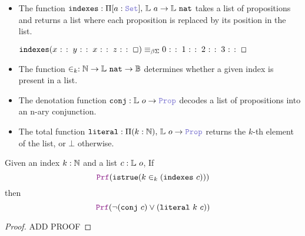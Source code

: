 \begin{itemize}
  \item The function $\kw{indexes}: \Pi [a: \set],\, \bb{L}~a \ra \bb{L}~\kw{nat}$  takes a list of propositions and returns a list where each proposition is replaced by its position in the list.
  \begin{example}[indexes]
  \(
    \mathop{\mathtt{indexes}} (x \mathbin{\colon\colon} y \mathbin{\colon\colon} x  \mathbin{\colon\colon} z \mathbin{\colon\colon} \Box) \equiv_{\beta\Sigma} 0 \mathbin{\colon\colon} 1 \mathbin{\colon\colon} 2 \mathbin{\colon\colon} 3 \mathbin{\colon\colon} \Box
  \)
  \end{example}
  \item The function $\in_k : \mathbb{N} \rightarrow \mathbb{L}~\texttt{\upshape{nat}} \rightarrow \mathbb{B}$  determines whether a given index is present in a list.
  \item The denotation function $\kw{conj}: \bb{L}~o \ra \prop$ decodes a list of propositions into an n-ary conjunction.
  \item The total function $\kw{literal}: \Pi (k: \N),\, \bb{L}~o \ra \prop$ returns the $k$-th element of the list, or $\bot$ otherwise.
\end{itemize}



\begin{lemma}
Given an index $k: \mathbb{N}$ and a list $c: \mathbb{L}~o$, If
\[
  \prf (\kw{istrue} (k \in_k (\kw{indexes}~c)))
\]
then
\[
  \prf (\neg (\kw{conj}~c) \lor (\kw{literal}~k~c))
\]
\begin{proof}
ADD PROOF
\end{proof}
\label{lem:and-pos}
\end{lemma}




